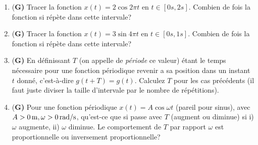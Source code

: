 \documentclass[french,12pt]{article}
\def\ang{25}    %
\begin{document}
\begin{enumerate}
\item {(\bf G)} Tracer la fonction $x(t) = 2 \cos 2\pi t$ en $t\in[0 s, 2 s]$. Combien de fois la fonction si répète dans cette intervale? 
\item {(\bf G)} Tracer la fonction $x(t) = 3 \sin 4\pi t$ en $t\in[0 s, 1 s]$. Combien de fois la fonction si répète dans cette intervale? 
\item {(\bf G)} En définissant $T$ (on appelle de \textit{période} ce valeur) étant le temps nécessaire pour une fonction périodique  revenir a sa position dans un instant $t$ donné, c'est-à-dire $g(t + T) = g(t)$. Calculez $T$ pour les cas précédents (il faut juste diviser la taille d'intervale par le nombre de répétitions).
\item {(\bf G)} Pour une fonction périodique $x(t) = A \cos \omega t$ (pareil pour sinus), avec $A>0 {\rm \, m}, \omega > 0 {\rm \, rad/s}$, qu'est-ce que si passe avec $T$ (augment ou diminue) si i) $\omega$ augmente, ii) $\omega$ diminue. Le comportement de $T$ par rapport $\omega$ est proportionnelle ou inversement proportionnelle? 

\end{enumerate}
\end{document}
